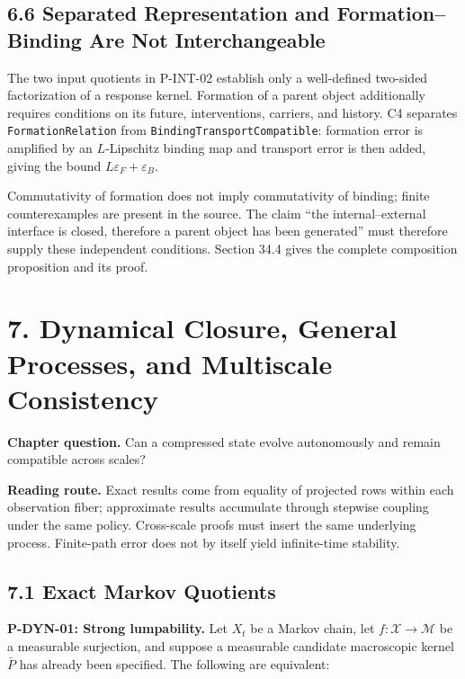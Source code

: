 \documentclass[
  english,
  11pt,
  oneside]{book}
\begin{document}
\section{6.6 Separated Representation and Formation--Binding Are Not Interchangeable}\label{separated-representation-and-formationbinding-are-not-interchangeable}

The two input quotients in P-INT-02 establish only a well-defined two-sided factorization of a response kernel. Formation of a parent object additionally requires conditions on its future, interventions, carriers, and history. C4 separates \nolinkurl{FormationRelation} from \nolinkurl{BindingTransportCompatible}: formation error is amplified by an \(L\)-Lipschitz binding map and transport error is then added, giving the bound \(L\varepsilon_F+\varepsilon_B\).

Commutativity of formation does not imply commutativity of binding; finite counterexamples are present in the source. The claim ``the internal--external interface is closed, therefore a parent object has been generated'' must therefore supply these independent conditions. Section 34.4 gives the complete composition proposition and its proof.

\chapter{7. Dynamical Closure, General Processes, and Multiscale Consistency}\label{ch-7}

\textbf{Chapter question.} Can a compressed state evolve autonomously and remain compatible across scales?

\textbf{Reading route.} Exact results come from equality of projected rows within each observation fiber; approximate results accumulate through stepwise coupling under the same policy. Cross-scale proofs must insert the same underlying process. Finite-path error does not by itself yield infinite-time stability.

\section{7.1 Exact Markov Quotients}\label{exact-markov-quotients}

\hypertarget{p-dyn-01}{}\label{p-dyn-01}

\textbf{P-DYN-01: Strong lumpability.} Let \(X_t\) be a Markov chain, let \(f:\mathcal X\to\mathcal M\) be a measurable surjection, and suppose a measurable candidate macroscopic kernel \(\bar P\) has already been specified. The following are equivalent:
\end{document}
